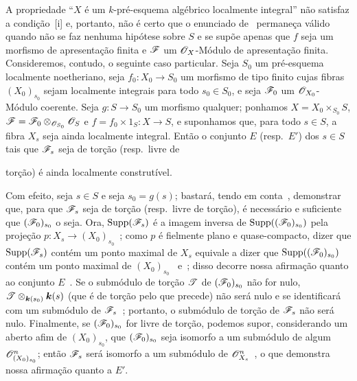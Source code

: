\begin{remark}[9.4.9]
\label{IV.9.4.9}
A propriedade ``$X$ é um $k$-pré-esquema algébrico localmente integral'' não satisfaz a condição~[i] e, portanto, não é certo que o enunciado de~ permaneça válido quando não se faz nenhuma hipótese sobre $S$ e se supõe apenas que $f$ seja um morfismo de apresentação finita e $\mathscr{F}$ um $\mathscr{O}_X$-Módulo de apresentação finita.
Consideremos, contudo, o seguinte caso particular.
Seja $S_0$ um pré-esquema localmente noetheriano, seja $f_0:X_0\to S_0$ um morfismo de tipo finito cujas fibras $(X_0)_{s_0}$ sejam localmente integrais para todo $s_0\in S_0$, e seja $\mathscr{F}_0$ um $\mathscr{O}_{X_0}$-Módulo coerente.
Seja $g:S\to S_0$ um morfismo qualquer; ponhamos
$X=X_0\times_{S_0}S$, $\mathscr{F}=\mathscr{F}_0\otimes_{\mathscr{O}_{S_0}}\mathscr{O}_S$ e $f=f_0\times 1_S:X\to S$, e suponhamos que, para todo $s\in S$, a fibra $X_s$ seja ainda localmente integral.
Então o conjunto $E$ \textnormal{(}resp.\ $E'$\textnormal{)} dos $s\in S$ tais que $\mathscr{F}_s$ seja de torção \textnormal{(}resp.\ livre de


torção\textnormal{)} é ainda localmente construtível.

Com efeito, seja $s\in S$ e seja $s_0=g(s)$; bastará, tendo em conta~, demonstrar que, para que $\mathscr{F}_s$ seja de torção \textnormal{(}resp.\ livre de torção\textnormal{)}, é necessário e suficiente que $(\mathscr{F}_0)_{s_0}$ o seja.
Ora, $\operatorname{Supp}(\mathscr{F}_s)$ é a imagem inversa de $\operatorname{Supp}((\mathscr{F}_0)_{s_0})$ pela projeção $p:X_s\to(X_0)_{s_0}$~; como $p$ é fielmente plano e quase-compacto, dizer que $\operatorname{Supp}(\mathscr{F}_s)$ contém um ponto maximal de $X_s$ equivale a dizer que $\operatorname{Supp}((\mathscr{F}_0)_{s_0})$ contém um ponto maximal de $(X_0)_{s_0}$~ e~; disso decorre nossa afirmação quanto ao conjunto $E$~.
Se o submódulo de torção $\mathscr{T}$ de $(\mathscr{F}_0)_{s_0}$ não for nulo, $\mathscr{T}\otimes_{\boldsymbol{k}(s_0)}\boldsymbol{k}(s)$ \textnormal{(}que é de torção pelo que precede\textnormal{)} não será nulo e se identificará com um submódulo de $\mathscr{F}_s$~; portanto, o submódulo de torção de $\mathscr{F}_s$ não será nulo.
Finalmente, se $(\mathscr{F}_0)_{s_0}$ for livre de torção, podemos supor, considerando um aberto afim de $(X_0)_{s_0}$, que $(\mathscr{F}_0)_{s_0}$ seja isomorfo a um submódulo de algum $\mathscr{O}_{(X_0)_{s_0}}^n$; então $\mathscr{F}_s$ será isomorfo a um submódulo de $\mathscr{O}_{X_s}^n$~, o que demonstra nossa afirmação quanto a $E'$.
\end{remark}


